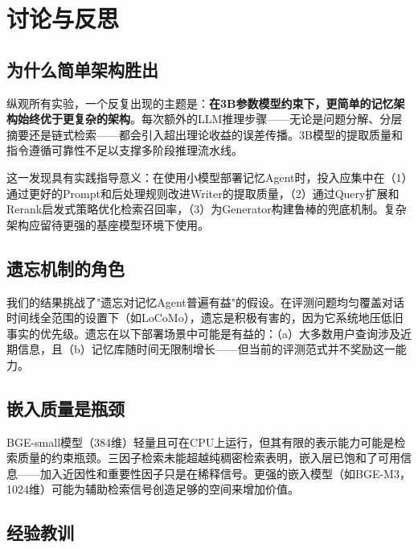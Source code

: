\documentclass[11pt,a4paper]{ctexart}
\begin{document}
\section{讨论与反思}

\subsection{为什么简单架构胜出}

纵观所有实验，一个反复出现的主题是：\textbf{在3B参数模型约束下，更简单的记忆架构始终优于更复杂的架构}。每次额外的LLM推理步骤——无论是问题分解、分层摘要还是链式检索——都会引入超出理论收益的误差传播。3B模型的提取质量和指令遵循可靠性不足以支撑多阶段推理流水线。

这一发现具有实践指导意义：在使用小模型部署记忆Agent时，投入应集中在（1）通过更好的Prompt和后处理规则改进Writer的提取质量，（2）通过Query扩展和Rerank启发式策略优化检索召回率，（3）为Generator构建鲁棒的兜底机制。复杂架构应留待更强的基座模型环境下使用。

\subsection{遗忘机制的角色}

我们的结果挑战了"遗忘对记忆Agent普遍有益"的假设。在评测问题均匀覆盖对话时间线全范围的设置下（如LoCoMo），遗忘是积极有害的，因为它系统地压低旧事实的优先级。遗忘在以下部署场景中可能是有益的：（a）大多数用户查询涉及近期信息，且（b）记忆库随时间无限制增长——但当前的评测范式并不奖励这一能力。

\subsection{嵌入质量是瓶颈}

BGE-small模型（384维）轻量且可在CPU上运行，但其有限的表示能力可能是检索质量的约束瓶颈。三因子检索未能超越纯稠密检索表明，嵌入层已饱和了可用信息——加入近因性和重要性因子只是在稀释信号。更强的嵌入模型（如BGE-M3，1024维）可能为辅助检索信号创造足够的空间来增加价值。

\subsection{经验教训}
\end{document}

